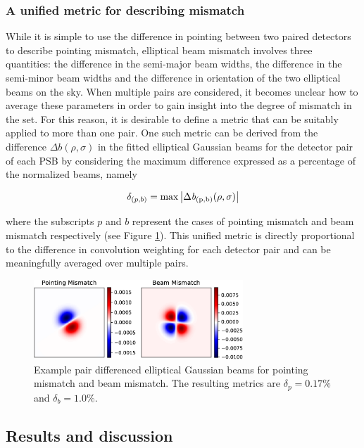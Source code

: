 \documentclass[a4paper,11pt]{article}
\begin{document}
\subsubsection{A unified metric for describing mismatch }
\label{sec::mismatch_metric}

While it is simple to use the difference in pointing between two paired detectors to describe pointing mismatch, elliptical beam mismatch involves three quantities: the difference in the semi-major beam widths, the difference in the semi-minor beam widths and the difference in orientation of the two elliptical beams on the sky. When multiple pairs are considered, it becomes unclear how to average these parameters in order to gain insight into the degree of mismatch in the set. For this reason, it is desirable to define a metric that can be suitably applied to more than one pair. One such metric can be derived from the difference $\Delta \mathit{b}(\rho,\sigma)$ in the fitted elliptical Gaussian beams for the detector pair of each PSB by considering the maximum difference expressed as a percentage of the normalized beams, namely

\begin{equation}
\delta_{(p,b)} = \rm{max}\left| \Delta \mathit{b}_{(p,b)}(\rho,\sigma) \right|
\end{equation}

\noindent
where the subscripts $p$ and $b$ represent the cases of pointing mismatch and beam mismatch respectively (see Figure \ref{fig::mismatch_metric}). This unified metric is directly proportional to the difference in convolution weighting for each detector pair and can be meaningfully averaged over multiple pairs. 

\begin{figure}
	\centering
	\includegraphics[width=0.7\textwidth]{figures/PairDiffSinglePair-crop.pdf}
	\caption{Example pair differenced elliptical Gaussian beams for pointing mismatch and beam mismatch. The resulting metrics are $\delta_p = 0.17\%$ and $\delta_b = 1.0\%$.}
	\label{fig::mismatch_metric}
\end{figure}

\subsection{Results and discussion}
\end{document}
